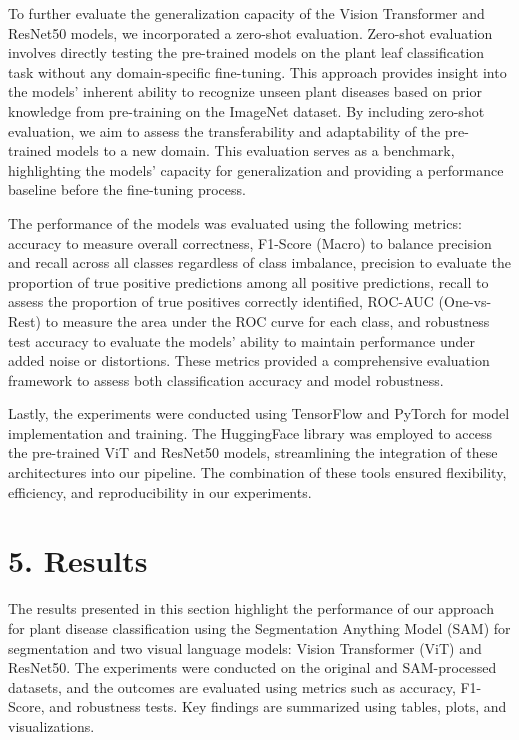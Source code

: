 \documentclass{article}
\begin{document}
To further evaluate the generalization capacity of the Vision Transformer and ResNet50 models, we incorporated a zero-shot evaluation. Zero-shot evaluation involves directly testing the pre-trained models on the plant leaf classification task without any domain-specific fine-tuning. This approach provides insight into the models' inherent ability to recognize unseen plant diseases based on prior knowledge from pre-training on the ImageNet dataset. By including zero-shot evaluation, we aim to assess the transferability and adaptability of the pre-trained models to a new domain. This evaluation serves as a benchmark, highlighting the models’ capacity for generalization and providing a performance baseline before the fine-tuning process.

The performance of the models was evaluated using the following metrics: accuracy to measure overall correctness, F1-Score (Macro) to balance precision and recall across all classes regardless of class imbalance, precision to evaluate the proportion of true positive predictions among all positive predictions, recall to assess the proportion of true positives correctly identified, ROC-AUC (One-vs-Rest) to measure the area under the ROC curve for each class, and robustness test accuracy to evaluate the models' ability to maintain performance under added noise or distortions. These metrics provided a comprehensive evaluation framework to assess both classification accuracy and model robustness.

Lastly, the experiments were conducted using TensorFlow and PyTorch for model implementation and training. The HuggingFace library was employed to access the pre-trained ViT and ResNet50 models, streamlining the integration of these architectures into our pipeline. The combination of these tools ensured flexibility, efficiency, and reproducibility in our experiments.





\section*{5. Results}

The results presented in this section highlight the performance of our approach for plant disease classification using the Segmentation Anything Model (SAM) for segmentation and two visual language models: Vision Transformer (ViT) and ResNet50. The experiments were conducted on the original and SAM-processed datasets, and the outcomes are evaluated using metrics such as accuracy, F1-Score, and robustness tests. Key findings are summarized using tables, plots, and visualizations.
\end{document}
